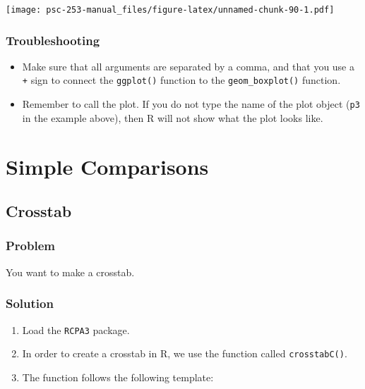 \documentclass[
]{book}
\providecommand{\tightlist}{%
  \setlength{\itemsep}{0pt}\setlength{\parskip}{0pt}}
\begin{document}
\texttt{[image: psc-253-manual\_files/figure-latex/unnamed-chunk-90-1.pdf]}

\hypertarget{troubleshooting-35}{%
\subsection{Troubleshooting}\label{troubleshooting-35}}

\begin{itemize}
\item
  Make sure that all arguments are separated by a comma, and that you use a \texttt{+} sign to connect the \texttt{ggplot()} function to the \texttt{geom\_boxplot()} function.
\item
  Remember to call the plot. If you do not type the name of the plot object (\texttt{p3} in the example above), then R will not show what the plot looks like.
\end{itemize}

\hypertarget{simple-comparisons}{%
\chapter{Simple Comparisons}\label{simple-comparisons}}

\hypertarget{crosstab}{%
\section{Crosstab}\label{crosstab}}

\hypertarget{problem-40}{%
\subsection{Problem}\label{problem-40}}

You want to make a crosstab.

\hypertarget{solution-39}{%
\subsection{Solution}\label{solution-39}}

\begin{enumerate}
\def\labelenumi{\arabic{enumi}.}
\tightlist
\item
  Load the \texttt{RCPA3} package.
\item
  In order to create a crosstab in R, we use the function called \texttt{crosstabC()}.\\
\item
  The function follows the following template:
\end{enumerate}
\end{document}
